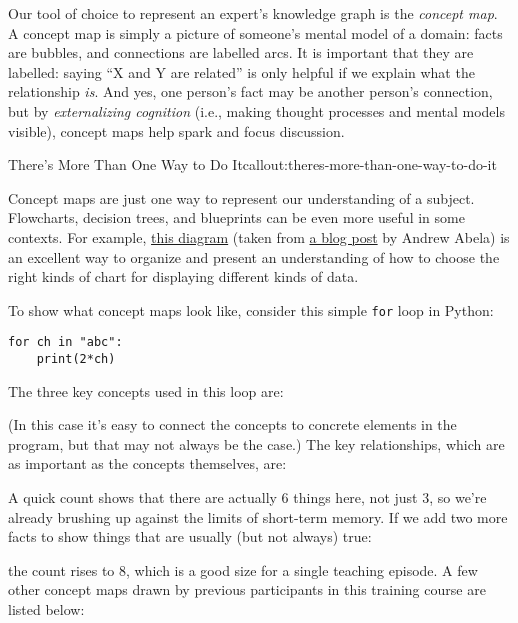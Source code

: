 Our tool of choice to represent an expert's knowledge graph is the
\emph{concept map}. A concept map is simply a picture of someone's
mental model of a domain: facts are bubbles, and connections are
labelled arcs. It is important that they are labelled: saying ``X and Y
are related'' is only helpful if we explain what the relationship
\emph{is}. And yes, one person's fact may be another person's
connection, but by \emph{externalizing cognition} (i.e., making thought
processes and mental models visible), concept maps help spark and focus
discussion.

\begin{callout}{There's More Than One Way to Do It}{callout:theres-more-than-one-way-to-do-it}

Concept maps are just one way to represent our understanding of a
subject. Flowcharts, decision trees, and blueprints can be even more
useful in some contexts. For example,
\href{fixme-abela}{this diagram}
(taken from \href{http://extremepresentation.typepad.com/blog/2006/09/choosing\_a\_good.html}{a blog post}
by Andrew Abela) is an excellent way to organize and present
an understanding of how to choose the right kinds of chart for
displaying different kinds of data.
\end{callout}

To show what concept maps look like, consider this simple \texttt{for}
loop in Python:

\begin{verbatim}
for ch in "abc":
    print(2*ch)
\end{verbatim}

The three key concepts used in this loop are:


(In this case it's easy to connect the concepts to concrete elements in
the program, but that may not always be the case.) The key
relationships, which are as important as the concepts themselves, are:


A quick count shows that there are actually 6 things here, not just 3,
so we're already brushing up against the limits of short-term memory. If
we add two more facts to show things that are usually (but not always)
true:


the count rises to 8, which is a good size for a single teaching
episode. A few other concept maps drawn by previous participants in this
training course are listed below:

